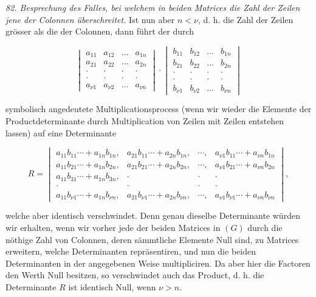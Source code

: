 \documentclass[11pt]{article}
\providecommand{\weberpage}[1]{}
\providecommand{\weq}[2]{\begin{equation}\tag{#1}#2\end{equation}}
\begin{document}
\textit{82. Besprechung des Falles, bei welchem in beiden Matrices die Zahl der Zeilen jene der Colonnen überschreitet.} Ist nun aber $n<\nu$, d. h. die Zahl der Zeilen grösser als die der Colonnen, dann führt der durch

\weq{G}{
\begin{vmatrix}
a_{11} & a_{12} & \dots & a_{1n}\\
a_{21} & a_{22} & \dots & a_{2n}\\
\cdot & \cdot & \cdot & \cdot\\
\cdot & \cdot & \cdot & \cdot\\
a_{\nu 1} & a_{\nu 2} & \dots & a_{\nu n}
\end{vmatrix}
\cdot
\begin{vmatrix}
b_{11} & b_{12} & \dots & b_{1n}\\
b_{21} & b_{22} & \dots & b_{2n}\\
\cdot & \cdot & \cdot & \cdot\\
\cdot & \cdot & \cdot & \cdot\\
b_{\nu 1} & b_{\nu 2} & \dots & b_{\nu n}
\end{vmatrix}
}


\weberpage{87}

symbolisch angedeutete Multiplicationsprocess (wenn wir wieder die Elemente der Productdeterminante durch Multiplication von Zeilen mit Zeilen entstehen lassen) auf eine Determinante

\[
R=
\begin{vmatrix}
a_{11}b_{11}\cdots+a_{1n}b_{1n}, & a_{21}b_{11}\cdots+a_{2n}b_{1n}, & \cdots, & a_{\nu 1}b_{11}\cdots+a_{\nu n}b_{1n}\\
a_{11}b_{21}\cdots+a_{1n}b_{2n}, & a_{21}b_{21}\cdots+a_{2n}b_{2n}, & \cdots, & a_{\nu 1}b_{21}\cdots+a_{\nu n}b_{2n}\\
a_{11}b_{31}\cdots+a_{1n}b_{3n}, & \cdot & \cdot & \cdot\\
\cdot & \cdot & \cdot & \cdot\\
a_{11}b_{\nu 1}\cdots+a_{1n}b_{\nu n}, & a_{21}b_{\nu 1}\cdots+a_{2n}b_{\nu n}, & \cdots, & a_{\nu 1}b_{\nu 1}\cdots+a_{\nu n}b_{\nu n}
\end{vmatrix},
\]

welche aber identisch verschwindet. Denn genau dieselbe Determinante würden wir erhalten, wenn wir vorher jede der beiden Matrices in $(G)$ durch die nöthige Zahl von Colonnen, deren sämmtliche Elemente Null sind, zu Matrices erweitern, welche Determinanten repräsentiren, und nun die beiden Determinanten in der angegebenen Weise multipliciren. Da aber hier die Factoren den Werth Null besitzen, so verschwindet auch das Product, d. h. die Determinante $R$ ist identisch Null, wenn $\nu>n$.
\end{document}
